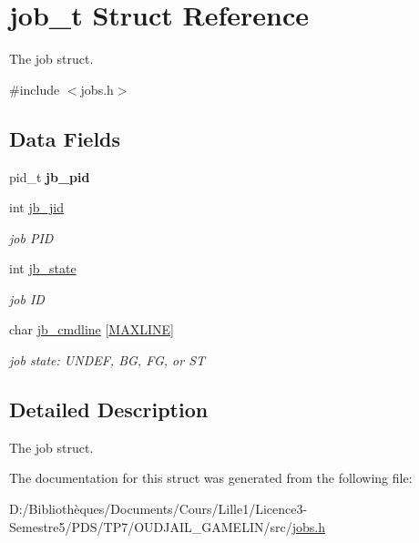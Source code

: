 \hypertarget{structjob__t}{}\section{job\+\_\+t Struct Reference}
\label{structjob__t}


The job struct.  




{\ttfamily \#include $<$jobs.\+h$>$}

\subsection*{Data Fields}
\begin{DoxyCompactItemize}
\item 
\hypertarget{structjob__t_a82fe3c0cecc3c72f11036d28a9679832}{}pid\+\_\+t {\bfseries jb\+\_\+pid}\label{structjob__t_a82fe3c0cecc3c72f11036d28a9679832}

\item 
\hypertarget{structjob__t_a92658a57dc4aaedcb04db49117b4f724}{}int \hyperlink{structjob__t_a92658a57dc4aaedcb04db49117b4f724}{jb\+\_\+jid}\label{structjob__t_a92658a57dc4aaedcb04db49117b4f724}

\begin{DoxyCompactList}\small\item\em job P\+I\+D \end{DoxyCompactList}\item 
\hypertarget{structjob__t_a749b836667db3e8ff7c09fd16a80abbe}{}int \hyperlink{structjob__t_a749b836667db3e8ff7c09fd16a80abbe}{jb\+\_\+state}\label{structjob__t_a749b836667db3e8ff7c09fd16a80abbe}

\begin{DoxyCompactList}\small\item\em job I\+D \end{DoxyCompactList}\item 
\hypertarget{structjob__t_af10055dc942d27ceae15c85513aae3f3}{}char \hyperlink{structjob__t_af10055dc942d27ceae15c85513aae3f3}{jb\+\_\+cmdline} \mbox{[}\hyperlink{common_8h_a3e937c42922f7601edb17b747602c471}{M\+A\+X\+L\+I\+N\+E}\mbox{]}\label{structjob__t_af10055dc942d27ceae15c85513aae3f3}

\begin{DoxyCompactList}\small\item\em job state\+: U\+N\+D\+E\+F, B\+G, F\+G, or S\+T \end{DoxyCompactList}\end{DoxyCompactItemize}


\subsection{Detailed Description}
The job struct. 

The documentation for this struct was generated from the following file\+:\begin{DoxyCompactItemize}
\item 
D\+:/\+Bibliothèques/\+Documents/\+Cours/\+Lille1/\+Licence3-\/\+Semestre5/\+P\+D\+S/\+T\+P7/\+O\+U\+D\+J\+A\+I\+L\+\_\+\+G\+A\+M\+E\+L\+I\+N/src/\hyperlink{jobs_8h}{jobs.\+h}\end{DoxyCompactItemize}

